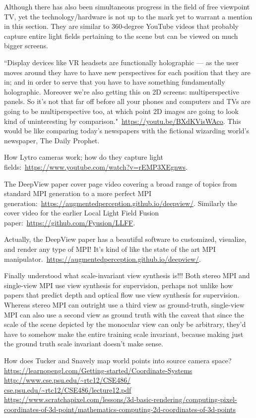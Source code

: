 Although there has also been simultaneous progress in the field of free viewpoint TV, yet the technology/hardware is not up to the mark yet to warrant a mention in this section. They are similar to 360-degree YouTube videos that probably capture entire light fields pertaining to the scene but can be viewed on much bigger screens.

``Display devices like VR headsets are functionally holographic --- as the user moves around they have to have new perspectives for each position that they are in; and in order to serve that you have to have something fundamentally holographic. Moreover we're also getting this on 2D screens: multiperspective panels. So it's not that far off before all your phones and computers and TVs are going to be multiperspective too, at which point 2D images are going to look kind of uninteresting by comparison."~\url{https://youtu.be/BXdKVisWAco}. This would be like comparing today's newspapers with the fictional wizarding world's newspaper, The Daily Prophet.

How Lytro cameras work; how do they capture light fields:~\url{https://www.youtube.com/watch?v=rEMP3XEgnws}.

The DeepView paper cover page video covering a broad range of topics from standard MPI generation to a more perfect MPI generation:~\url{https://augmentedperception.github.io/deepview/}. Similarly the cover video for the earlier Local Light Field Fusion paper:~\url{https://github.com/Fyusion/LLFF}. 

Actually, the DeepView paper has a beautiful software to customized, visualize, and render any type of MPI! It's kind of like the state of the art MPI manipulator.~\url{https://augmentedperception.github.io/deepview/}.

Finally understood what scale-invariant view synthesis is!!! Both stereo MPI and single-view MPI use view synthesis for supervision, perhaps not unlike how papers that predict depth and optical flow use view synthesis for supervision. Whereas stereo MPI can outright use a third view as ground-truth, single-view MPI can also use a second view as ground truth with the caveat that since the scale of the scene depicted by the monocular view can only be arbitrary, they'd have to somehow make the entire training scale invariant, because making just the ground truth scale invariant doesn't make sense.

How does Tucker and Snavely map world points into source camera space?
\url{https://learnopengl.com/Getting-started/Coordinate-Systems}
\url{http://www.cse.psu.edu/~rtc12/CSE486/}
\url{cse.psu.edu/~rtc12/CSE486/lecture12.pdf}
\url{https://www.scratchapixel.com/lessons/3d-basic-rendering/computing-pixel-coordinates-of-3d-point/mathematics-computing-2d-coordinates-of-3d-points}

